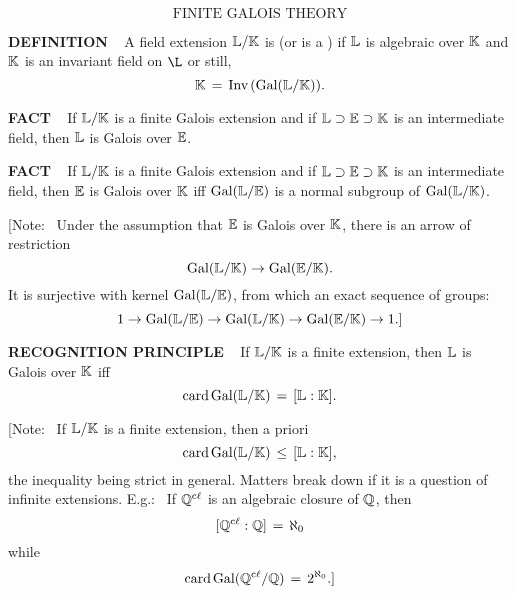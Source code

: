 

\setcounter{theoremn}{0}

\newpage

\ \indent 

\[
\text{FINITE GALOIS THEORY}
\]

\begin{x}{\small\bf DEFINITION} \ %
A field extension $\mathbb{L}/\mathbb{K}$ is 
(or is a 
)
if $\mathbb{L}$ is algebraic over $\mathbb{K}$ and $\mathbb{K}$ is an invariant field on $\L$ or still, 
\[
\mathbb{K} \hspace{0.05cm} = \hspace{0.05cm} \text{Inv}\hspace{0.05cm}(\text{Gal}(\mathbb{L}/\mathbb{K})).
\]
\end{x}

\vspace{0.1cm}


\begin{x}{\small\bf FACT} \ %
If $\mathbb{L}/\mathbb{K}$ is a finite Galois extension and if $\mathbb{L} \supset \mathbb{E} \supset \mathbb{K}$ is an intermediate field, then $\mathbb{L}$ is Galois over $\mathbb{E}$.
\end{x}

\vspace{0.1cm}

\begin{x}{\small\bf FACT} \ %
If $\mathbb{L}/\mathbb{K}$ is a finite Galois extension and if $\mathbb{L} \supset \mathbb{E} \supset \mathbb{K}$ is an intermediate field, then $\mathbb{E}$ is Galois over $\mathbb{K}$ 
iff $\text{Gal}(\mathbb{L}/\mathbb{E})$ is a normal subgroup of $\text{Gal}(\mathbb{L}/\mathbb{K})$. 

\vspace{0.1cm}

[Note: \ Under the assumption that $\mathbb{E}$ is Galois over $\mathbb{K}$, there is an arrow of restriction
\[
\text{Gal}(\mathbb{L}/\mathbb{K}) \rightarrow \text{Gal}(\mathbb{E}/\mathbb{K}).
\]
It is surjective with kernel $\text{Gal}(\mathbb{L}/\mathbb{E})$, from which an exact sequence of groups:
\[
1 \rightarrow \text{Gal}(\mathbb{L}/\mathbb{E}) \rightarrow \text{Gal}(\mathbb{L}/\mathbb{K})  \rightarrow \text{Gal}(\mathbb{E}/\mathbb{K}) \rightarrow 1.]
\]
\end{x}

\vspace{0.1cm}



\begin{x}{\small\bf RECOGNITION  PRINCIPLE} \ %
If $\mathbb{L}/\mathbb{K}$ is a finite extension, then $\mathbb{L}$ is Galois over $\mathbb{K}$ iff 
\[
\text{card}\hspace{0.05cm} \text{Gal}(\mathbb{L}/\mathbb{K}) \hspace{0.05cm} = \hspace{0.05cm} [\mathbb{L}:\mathbb{K}].
\]

\vspace{0.1cm}

[Note: \ If $\mathbb{L}/\mathbb{K}$ is a finite extension, then a priori
\[
\text{card}\hspace{0.05cm} \text{Gal}(\mathbb{L}/\mathbb{K}) \hspace{0.05cm} \leq \hspace{0.05cm} [\mathbb{L}:\mathbb{K}],
\]
the inequality being strict in general.  Matters break down if it is a question of infinite extensions.  
E.g.: \ If $\mathbb{Q}^{\text{c$\ell$}}$ is an algebraic closure of $\mathbb{Q}$, then 
\[
[\mathbb{Q}^{\text{c$\ell$}}:\mathbb{Q}] \hspace{0.05cm} = \hspace{0.05cm} \aleph_0
\]
while
\[
\text{card}\hspace{0.05cm} \text{Gal}(\mathbb{Q}^{\text{c$\ell$}} / \mathbb{Q}) \hspace{0.05cm} = \hspace{0.05cm} 2^{\aleph_0}.]
\]
\end{x}


